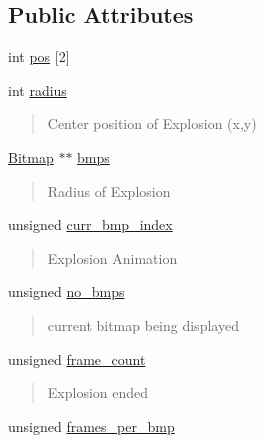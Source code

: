 \subsection*{Public Attributes}
\begin{DoxyCompactItemize}
\item 
int \hyperlink{structexplosion__t_a75cfb98cbaf58d5050310154d9acd899}{pos} \mbox{[}2\mbox{]}
\item 
int \hyperlink{structexplosion__t_a1a6cee063c004b26862a9bfefb443d9d}{radius}
\begin{DoxyCompactList}\small\item\em \begin{quote}
Center position of Explosion (x,y) \end{quote}
\end{DoxyCompactList}\item 
\hyperlink{struct_bitmap}{Bitmap} $\ast$$\ast$ \hyperlink{structexplosion__t_ac70416c24cbc420b431ca0ae420e3c56}{bmps}
\begin{DoxyCompactList}\small\item\em \begin{quote}
Radius of Explosion \end{quote}
\end{DoxyCompactList}\item 
unsigned \hyperlink{structexplosion__t_ada685f079492730e96d875d5d8d4d6f9}{curr\+\_\+bmp\+\_\+index}
\begin{DoxyCompactList}\small\item\em \begin{quote}
Explosion Animation \end{quote}
\end{DoxyCompactList}\item 
unsigned \hyperlink{structexplosion__t_a2f8ea40859d72273c6832774e9c501ed}{no\+\_\+bmps}
\begin{DoxyCompactList}\small\item\em \begin{quote}
current bitmap being displayed \end{quote}
\end{DoxyCompactList}\item 
unsigned \hyperlink{structexplosion__t_a84bc7211fa4f7cca4841b6a43e2404d0}{frame\+\_\+count}
\begin{DoxyCompactList}\small\item\em \begin{quote}
Explosion ended \end{quote}
\end{DoxyCompactList}\item 
unsigned \hyperlink{structexplosion__t_a2793afa1a8a4c984dd1d3ac5b4cb1eba}{frames\+\_\+per\+\_\+bmp}
\end{DoxyCompactItemize}



